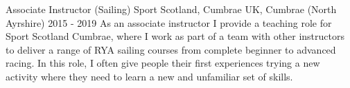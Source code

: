   \cventry
    {Associate Instructor (Sailing)} %
    {Sport Scotland, Cumbrae} %
    {UK, Cumbrae (North Ayrshire)} %
    {2015 - 2019} %
    {
      As an associate instructor I provide a teaching role for Sport Scotland 
      Cumbrae, where I work as part of a team with other instructors to 
      deliver a range of RYA sailing courses from complete beginner to 
      advanced racing. In this role, I often give people their first 
      experiences trying a new activity where they need to learn a new and 
      unfamiliar set of skills.\newline
    }
